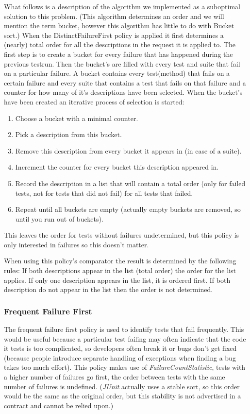 \documentclass[i2]{oss}
\newcommand{\class}[1]{\emph{#1}}
\newcommand{\junit}{\emph{JUnit }}
\begin{document}
What follows is a description of the algorithm we implemented as a 
suboptimal solution to this problem.
(This algorithm determines an order and we will mention the term bucket,
however this algorithm has little to do with Bucket sort.)
When the DistinctFailureFirst policy is applied it first determines a 
(nearly) total order for all the descriptions in the request it is 
applied to.
The first step is to create a bucket for every failure that has 
happened during the previous testrun.
Then the bucket's are filled with every test and suite that fail on a 
particular failure.
A bucket contains every test(method) that fails on a certain failure 
and every suite that contains a test that fails on that failure and a 
counter for how many of it's descriptions have been selected.
When the bucket's have been created an iterative process of selection is
started:
\begin{enumerate}
	\item Choose a bucket with a minimal counter.
	\item Pick a description from this bucket.
	\item Remove this description from every bucket it appears in
    		(in case of a suite).
	\item Increment the counter for every bucket this description
    		appeared in.
	\item Record the description in a list that will contain a total 
    		order
            (only for failed tests, not for tests that did not fail)
			for all tests that failed.
	\item Repeat until all buckets are empty (actually empty buckets 
    		are removed, so until you run out of buckets).
\end{enumerate}
This leaves the order for tests without failures undetermined, but this policy is only interested in failures so this doesn't matter.
            
When using this policy's comparator the result is determined by the 
following rules:
If both descriptions appear in the list (total order) the order for the 
list applies.
If only one description appears in the list, it is ordered first.
If both description do not appear in the list then the order is not 
determined.

\subsubsection{Frequent Failure First}

The frequent failure first policy is used to identify tests that fail
frequently.
This would be useful because a particular test failing may often indicate 
that the code it tests is too complicated, so developers often break it 
or bugs don't get fixed (because people introduce separate handling of 
exceptions when finding a bug takes too much effort).
This policy makes use of \class{FailureCountStatistic}, tests with a 
higher number of failures go first, the order between tests with the same 
number of failures is undefined.
(\junit actually uses a stable sort, so this order would be the same as 
the original order, but this stability is not advertised in a contract 
and cannot be relied upon.)
\end{document}
